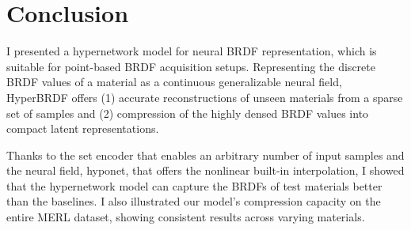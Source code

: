 \section{Conclusion}\label{sec:conc}

I presented a hypernetwork model for neural BRDF representation, which is suitable for point-based BRDF acquisition setups. Representing the discrete BRDF values of a material as a continuous generalizable neural field, HyperBRDF offers (1) accurate reconstructions of unseen materials from a sparse set of samples and (2) compression of the highly densed BRDF values into compact latent representations. 

Thanks to the set encoder that enables an arbitrary number of input samples and the neural field, hyponet, that offers the nonlinear built-in interpolation, I showed that the hypernetwork model can capture the BRDFs of test materials better than the baselines. I also illustrated our model's compression capacity on the entire MERL dataset, showing consistent results across varying materials.